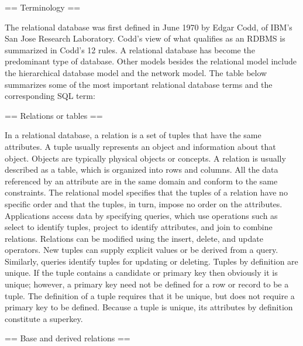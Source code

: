 == Terminology ==

The relational database was first defined in June 1970 by Edgar Codd, of IBM's San Jose Research Laboratory. Codd's view of what qualifies as an RDBMS is summarized in Codd's 12 rules. A relational database has become the predominant type of database. Other models besides the relational model include the hierarchical database model and the network model.
The table below summarizes some of the most important relational database terms and the corresponding SQL term:


== Relations or tables ==

In a relational database, a relation is a set of tuples that have the same attributes. A tuple usually represents an object and information about that object. Objects are typically physical objects or concepts. A relation is usually described as a table, which is organized into rows and columns. All the data referenced by an attribute are in the same domain and conform to the same constraints.
The relational model specifies that the tuples of a relation have no specific order and that the tuples, in turn, impose no order on the attributes. Applications access data by specifying queries, which use operations such as select to identify tuples, project to identify attributes, and join to combine relations. Relations can be modified using the insert, delete, and update operators. New tuples can supply explicit values or be derived from a query. Similarly, queries identify tuples for updating or deleting.
Tuples by definition are unique. If the tuple contains a candidate or primary key then obviously it is unique; however, a primary key need not be defined for a row or record to be a tuple. The definition of a tuple requires that it be unique, but does not require a primary key to be defined. Because a tuple is unique, its attributes by definition constitute a superkey.


== Base and derived relations ==
